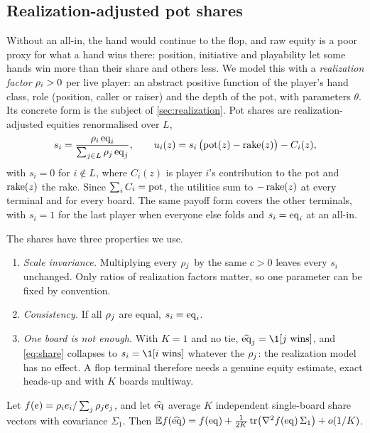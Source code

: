 \subsection{Realization-adjusted pot shares}\label{sec:shares-maths}

Without an all-in, the hand would continue to the flop, and raw equity is a poor proxy for what a hand wins there:
position, initiative and playability let some hands win more than their share and others less. We model this with a
\emph{realization factor} $\rho_i > 0$ per live player: an abstract positive function of the player's hand class,
role (position, caller or raiser) and the depth of the pot, with parameters $\theta$. Its concrete form is the subject
of \cref{sec:realization}. Pot shares are realization-adjusted equities renormalised over $L$,
\begin{equation}\label{eq:share}
  s_i = \frac{\rho_i\, \mathrm{eq}_i}{\sum_{j\in L} \rho_j\, \mathrm{eq}_j}, \qquad
  u_i(z) = s_i\,\big(\mathrm{pot}(z) - \operatorname{rake}(z)\big) - C_i(z),
\end{equation}
with $s_i = 0$ for $i \notin L$, where $C_i(z)$ is player $i$'s contribution to the pot and $\operatorname{rake}(z)$ the rake.
Since $\sum_i C_i = \mathrm{pot}$, the utilities sum to $-\operatorname{rake}(z)$ at every terminal and for every board. The same payoff
form covers the other terminals, with $s_i = 1$ for the last player when everyone else folds and $s_i = \mathrm{eq}_i$ at an
all-in.

The shares have three properties we use.
\begin{enumerate}[label=(\roman*)]
\item \emph{Scale invariance.} Multiplying every $\rho_j$ by the same $c > 0$ leaves every $s_i$ unchanged. Only
  ratios of realization factors matter, so one parameter can be fixed by convention.
\item \emph{Consistency.} If all $\rho_j$ are equal, $s_i = \mathrm{eq}_i$.
\item \emph{One board is not enough.} With $K = 1$ and no tie, $\widehat\eq_j = \1[j \text{ wins}]$, and
  \eqref{eq:share} collapses to $s_i = \1[i\text{ wins}]$ whatever the $\rho_j$: the realization model has no effect.
  A flop terminal therefore needs a genuine equity estimate, exact heads-up and with $K$ boards multiway.
\end{enumerate}

\begin{proposition}\label{prop:share-bias}
Let $f(e) = \rho_i e_i / \sum_j \rho_j e_j$, and let $\widehat{\mathrm{eq}}$ average $K$ independent single-board share
vectors with covariance $\Sigma_1$. Then $\mathbb{E} f(\widehat{\mathrm{eq}}) = f(\mathrm{eq}) + \frac{1}{2K}\operatorname{tr}\!\big(\nabla^2
f(\mathrm{eq})\, \Sigma_1\big) + o(1/K)$.
\end{proposition}

